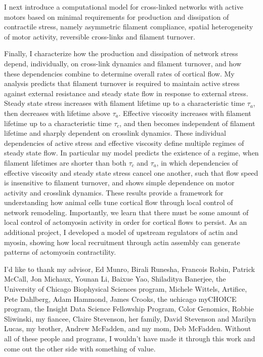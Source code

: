 \documentclass{easychithesis}
\begin{document}
I next introduce a computational model for cross-linked networks with active motors based on minimal requirements for production and dissipation of contractile stress, namely asymmetric filament compliance, spatial heterogeneity of motor activity, reversible cross-links and filament turnover.  

Finally, I characterize how the production and dissipation of network stress depend, individually, on cross-link dynamics and filament turnover, and how these dependencies combine to determine overall rates of cortical flow. My analysis predicts that filament turnover is required to maintain active stress against external resistance and steady state flow in response to external stress. Steady state stress increases with filament lifetime up to a characteristic time $\tau_{a}$, then decreases with lifetime above $\tau_{a}$.   Effective viscosity increases with filament lifetime up to a characteristic time $\tau_c$, and then becomes independent of filament lifetime and sharply dependent on crosslink dynamics.  These individual dependencies of active stress and effective viscosity define multiple regimes of steady state flow.  In particular my model predicts the existence of a regime, when filament lifetimes are shorter than both $\tau_c$ and $\tau_{a}$, in which dependencies of effective viscosity and steady state stress cancel one another, such that flow speed is insensitive to filament turnover, and shows simple dependence on motor activity and crosslink dynamics.  These results provide a framework for understanding how animal cells tune cortical flow through local control of network remodeling.  Importantly, we learn that there must be some amount of local control of actomyosin activity in order for cortical flows to persist.  As an additional project, I developed a model of upstream regulators of actin and myosin, showing how local recruitment through actin assembly can generate patterns of actomyosin contractility. 


I'd like to thank my advisor, Ed Munro, Birali Runesha, Francois Robin, Patrick McCall, Jon Michaux, Younan Li, Baixue Yao, Shiladitya Banerjee, the University of Chicago Biophysical Sciences program, Michele Wittels, Artifice, Pete Dahlberg, Adam Hammond, James Crooks, the uchicago myCHOICE program, the Insight Data Science Fellowship Program, Color Genomics, Robbie Sliwinski, my fiancee, Claire Stevenson, her family, David Stevenson and Marilyn Lucas, my brother, Andrew McFadden, and my mom, Deb McFadden.  Without all of these people and programs, I wouldn't have made it through this work and come out the other side with something of value.
\end{document}
